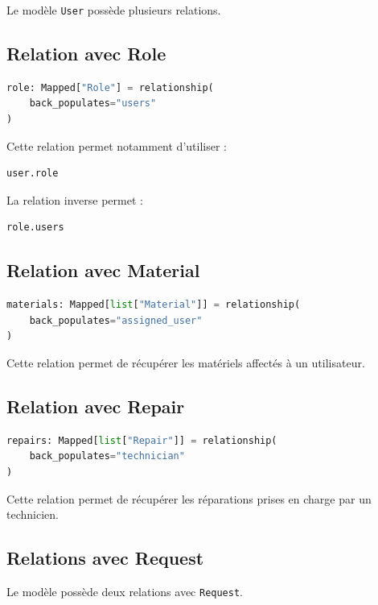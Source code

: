 \documentclass[12pt,a4paper]{report}
\begin{document}
Le modèle \texttt{User} possède plusieurs relations.

\subsection{Relation avec Role}

\begin{lstlisting}[language=Python]
role: Mapped["Role"] = relationship(
    back_populates="users"
)
\end{lstlisting}

Cette relation permet notamment d'utiliser :

\begin{lstlisting}[language=Python]
user.role
\end{lstlisting}

La relation inverse permet :

\begin{lstlisting}[language=Python]
role.users
\end{lstlisting}

\subsection{Relation avec Material}

\begin{lstlisting}[language=Python]
materials: Mapped[list["Material"]] = relationship(
    back_populates="assigned_user"
)
\end{lstlisting}

Cette relation permet de récupérer les matériels affectés à un utilisateur.

\subsection{Relation avec Repair}

\begin{lstlisting}[language=Python]
repairs: Mapped[list["Repair"]] = relationship(
    back_populates="technician"
)
\end{lstlisting}

Cette relation permet de récupérer les réparations prises en charge par
un technicien.

\subsection{Relations avec Request}

Le modèle possède deux relations avec \texttt{Request}.
\end{document}
